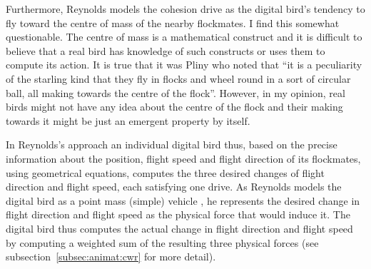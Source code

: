 Furthermore, Reynolds models the cohesion drive as the digital bird's tendency to fly toward the centre of mass of the nearby flockmates. I find this somewhat questionable. The centre of mass is a mathematical construct and it is difficult to believe that a real bird has knowledge of such constructs or uses them to compute its action. It is true that it was Pliny \cite{heppner:1997} who noted that ``it is a peculiarity of the starling kind that they fly in flocks and wheel round in a sort of circular ball, all making towards the centre of the flock''. However, in my opinion, real birds might not have any idea about the centre of the flock and their making towards it might be just an emergent property by itself.

In Reynolds's approach an individual digital bird thus, based on the precise information about the position, flight speed and flight direction of its flockmates, using geometrical equations, computes the three desired changes of flight direction and flight speed, each satisfying one drive. As Reynolds models the digital bird as a point mass (simple) vehicle \cite{reynolds:1987,reynolds:1999}, he represents the desired change in flight direction and flight speed as the physical force that would induce it. The digital bird thus computes the actual change in flight direction and flight speed by computing a weighted sum of the resulting three physical forces (see subsection~\ref{subsec:animat:cwr} for more detail).
 
